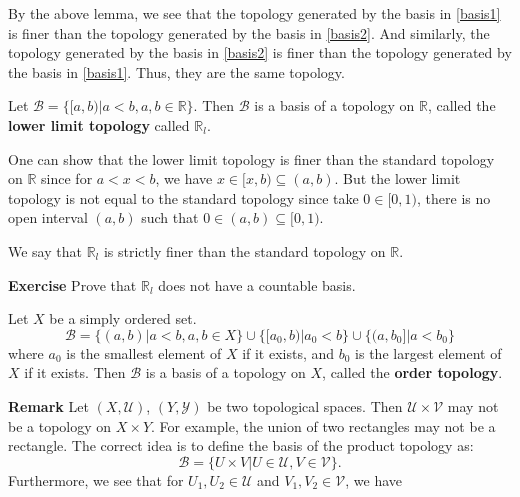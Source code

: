 \documentclass[main.tex]{subfiles}
\begin{document}
\begin{example}
    By the above lemma, we see that the topology generated by the basis in \ref{basis1} is finer than the topology generated by the basis in \ref{basis2}. And similarly, the topology generated by the basis in \ref{basis2} is finer than the topology generated by the basis in \ref{basis1}. Thus, they are the same topology.
\end{example}
\begin{example}
    Let $\mathcal{B} = \{[a, b) | a < b, a, b \in \mathbb{R}\}$. Then $\mathcal{B}$ is a basis of a topology on $\mathbb{R}$, called the \textbf{lower limit topology} called $\mathbb{R}_l$.
    \par One can show that the lower limit topology is finer than the standard topology on $\mathbb{R}$ since for $a < x < b$, we have $x \in [x, b) \subseteq (a, b)$. But the lower limit topology is not equal to the standard topology since take $0\in [0, 1)$, there is no open interval $(a, b)$ such that $0 \in (a, b) \subseteq [0, 1)$.
    \par We say that $\mathbb{R}_l$ is strictly finer than the standard topology on $\mathbb{R}$. 
\end{example}
\par \noindent \textbf{Exercise} Prove that $\mathbb{R}_l$ does not have a countable basis. 
\begin{example}
    Let $X$ be a simply ordered set. 
    \begin{equation}
        \mathcal{B} = \{(a, b) | a < b, a, b \in X\} \cup \{[a_0, b)| a_0 < b\} \cup \{(a, b_0] | a < b_0\}
    \end{equation} 
    where $a_0$ is the smallest element of $X$ if it exists, and $b_0$ is the largest element of $X$ if it exists. Then $\mathcal{B}$ is a basis of a topology on $X$, called the \textbf{order topology}.
\end{example}
\par \noindent \textbf{Remark} Let $(X, \mathcal{U})$, $(Y, \mathcal{Y})$ be two topological spaces. Then $\mathcal{U}\times \mathcal{V}$ may not be a topology on $X \times Y$. For example, the union of two rectangles may not be a rectangle. The correct idea is to define the basis of the product topology as:
\begin{equation}
    \mathcal{B} = \{U \times V | U \in \mathcal{U}, V \in \mathcal{V}\}.
\end{equation}
Furthermore, we see that for $U_1, U_2\in \mathcal{U}$ and $V_1, V_2 \in \mathcal{V}$, we have
\end{document}
